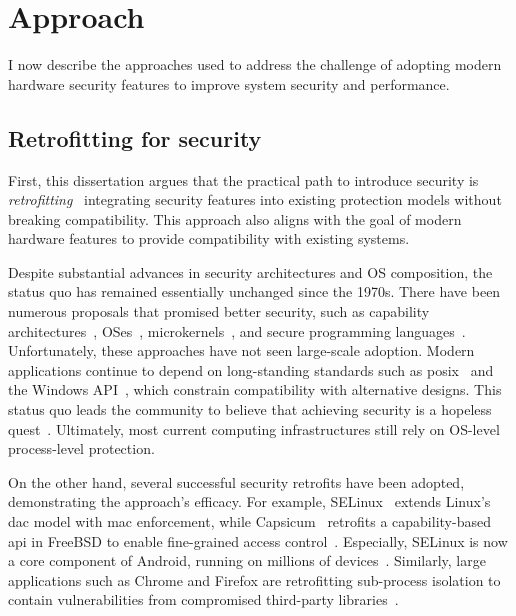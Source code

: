 \clearpage

\section{Approach}

I now describe the approaches used to address the challenge of adopting modern hardware security features to improve system security and performance.

\subsection{Retrofitting for security}

First, this dissertation argues that the practical path to introduce security is \emph{retrofitting} \dash\ integrating security features into existing protection models without breaking compatibility.
This approach also aligns with the goal of modern hardware features to provide compatibility with existing systems.

Despite substantial advances in security architectures and OS composition, the status quo has remained essentially unchanged since the 1970s.
There have been numerous proposals that promised better security, such as capability architectures~\cite{cap-addressing,cambridge-cap}, OSes~\cite{hydra,eros,cambridge-cap}, microkernels~\cite{sel4}, and secure programming languages~\cite{matsakis_rust_2014,caja}.
Unfortunately, these approaches have not seen large-scale adoption.
Modern applications continue to depend on long-standing standards such as \gls{posix}~\cite{posix} and the Windows API~\cite{winapi}, which constrain compatibility with alternative designs.
This status quo leads the community to believe that achieving security is a hopeless quest~\cite{hopelessquest}.
Ultimately, most current computing infrastructures still rely on OS-level process-level protection.


On the other hand, several successful security retrofits have been adopted, demonstrating the approach's efficacy.
For example, SELinux~\cite{selinux} extends Linux's \gls{dac} model with \gls{mac} enforcement, while Capsicum~\cite{watson2010capsicum} retrofits a capability-based \gls{api} in FreeBSD to enable fine-grained access control~\cite{freebsd-capsicum}.
Especially, SELinux is now a core component of Android, running on millions of devices~\cite{droidcap}.
Similarly, large applications such as Chrome and Firefox are retrofitting sub-process isolation to contain vulnerabilities from compromised third-party libraries~\cite{rlbox}.


